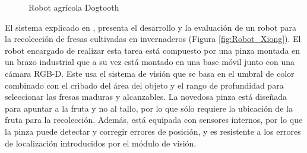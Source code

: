 \begin{figure}[H]
    \begin{center}
      \subcapcentertrue
      \hspace{2mm}
    \end{center}
    \caption{Robot agrícola Dogtooth}
    \label{fig:Dogtooth}
\end{figure}
\pagebreak

El sistema explicado en \cite{Xiong19}, presenta el desarrollo y la evaluación de un robot para la recolección de fresas cultivadas en invernaderos (Figura \ref{fig:Robot_Xiong}). El robot encargado de realizar esta tarea está compuesto por una pinza montada en un brazo industrial que a su vez está montado en una base móvil junto con una cámara RGB-D. Este usa el sistema de visión que se basa en el umbral de color combinado con el cribado del área del objeto y el rango de profundidad para seleccionar las fresas maduras y alcanzables. La novedosa pinza está diseñada para apuntar a la fruta y no al tallo, por lo que sólo requiere la ubicación de la fruta para la recolección. Además, está equipada con sensores internos, por lo que la pinza puede detectar y corregir errores de posición, y es resistente a los errores de localización introducidos por el módulo de visión. %

